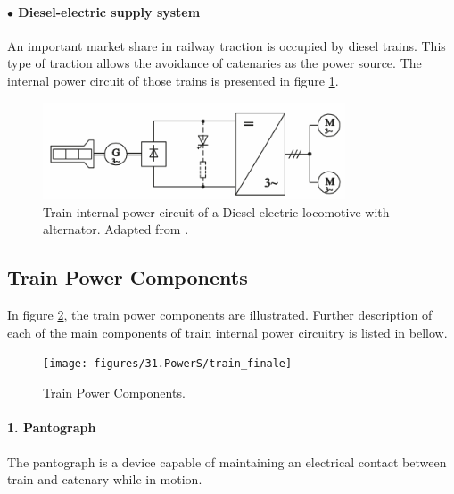 \paragraph{$\bullet$ Diesel-electric supply system\\}

An important market share in railway traction is occupied by diesel trains. This type of traction allows the avoidance of catenaries as the power source. The internal power circuit of those trains is presented in figure \ref{fig:steimel2008c}.

\begin{figure}[h!]
	\centering
	\begin{minipage}{.7\textwidth}
		\centering
		\includegraphics[width=0.8\textwidth,keepaspectratio]{figures/31.PowerS/steimel2008c}
		\caption{Train internal power circuit of a Diesel electric locomotive with alternator. Adapted from \cite{steimel2008}.}
		\label{fig:steimel2008c}
	\end{minipage}
\end{figure}

\newpage
\subsection{Train Power Components}
\label{subs:314}

In figure \ref{fig:train_finale}, the train power components are illustrated. Further description of each of the main components of train internal power circuitry is listed in bellow.


\begin{figure}[h!]
	\centering
	\texttt{[image: figures/31.PowerS/train\_finale]}
	\caption{Train Power Components.}
	\label{fig:train_finale}
\end{figure}

\paragraph{1. Pantograph\\}

	The pantograph is a device capable of maintaining an electrical contact between train and catenary while in motion.
	

